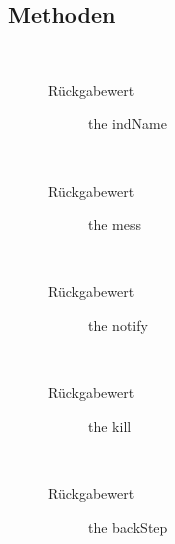 \subsection{Methoden}
\begin{description}
\item[{\label{ontologyFramework.OFErrorManagement.OFException.ExceptionData.getIndName()}}]
~ 
\begin{description}
\item[Rückgabewert] 
the indName
\end{description}
\item[{\label{ontologyFramework.OFErrorManagement.OFException.ExceptionData.getMess()}}]
~ 
\begin{description}
\item[Rückgabewert] 
the mess
\end{description}
\item[{\label{ontologyFramework.OFErrorManagement.OFException.ExceptionData.isNotify()}}]
~ 
\begin{description}
\item[Rückgabewert] 
the notify
\end{description}
\item[{\label{ontologyFramework.OFErrorManagement.OFException.ExceptionData.isKill()}}]
~ 
\begin{description}
\item[Rückgabewert] 
the kill
\end{description}
\item[{\label{ontologyFramework.OFErrorManagement.OFException.ExceptionData.getBackStep()}}]
~ 
\begin{description}
\item[Rückgabewert] 
the backStep
\end{description}
\item[{\label{ontologyFramework.OFErrorManagement.OFException.ExceptionData.getNotifier()}}]
~ 
\begin{description}

\end{description}
\end{description}
